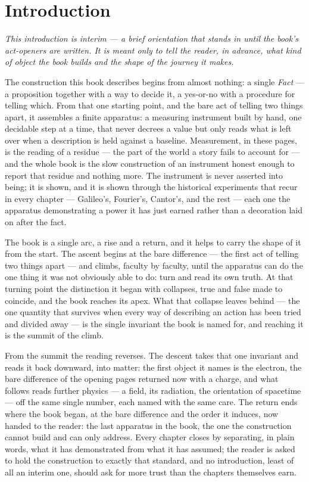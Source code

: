 \chapter*{Introduction}

\emph{This introduction is interim --- a brief orientation that stands in until the book's act-openers
are written. It is meant only to tell the reader, in advance, what kind of object the book builds and the
shape of the journey it makes.}

The construction this book describes begins from almost nothing: a single \emph{Fact} --- a proposition
together with a way to decide it, a yes-or-no with a procedure for telling which. From that one starting
point, and the bare act of telling two things apart, it assembles a finite apparatus: a measuring
instrument built by hand, one decidable step at a time, that never decrees a value but only reads what is
left over when a description is held against a baseline. Measurement, in these pages, is the reading of a
residue --- the part of the world a story fails to account for --- and the whole book is the slow
construction of an instrument honest enough to report that residue and nothing more. The instrument is
never asserted into being; it is shown, and it is shown through the historical experiments that recur in
every chapter --- Galileo's, Fourier's, Cantor's, and the rest --- each one the apparatus demonstrating a
power it has just earned rather than a decoration laid on after the fact.

The book is a single arc, a rise and a return, and it helps to carry the shape of it from the start. The
ascent begins at the bare difference --- the first act of telling two things apart --- and climbs,
faculty by faculty, until the apparatus can do the one thing it was not obviously able to do: turn and
read its own truth. At that turning point the distinction it began with collapses, true and false made to
coincide, and the book reaches its apex. What that collapse leaves behind --- the one quantity that
survives when every way of describing an action has been tried and divided away --- is the single
invariant the book is named for, and reaching it is the summit of the climb.

From the summit the reading reverses. The descent takes that one invariant and reads it back downward,
into matter: the first object it names is the electron, the bare difference of the opening pages returned
now with a charge, and what follows reads further physics --- a field, its radiation, the orientation of
spacetime --- off the same single number, each named with the same care. The return ends where the book
began, at the bare difference and the order it induces, now handed to the reader: the last apparatus in
the book, the one the construction cannot build and can only address. Every chapter closes by separating,
in plain words, what it has demonstrated from what it has assumed; the reader is asked to hold the
construction to exactly that standard, and no introduction, least of all an interim one, should ask for
more trust than the chapters themselves earn.
